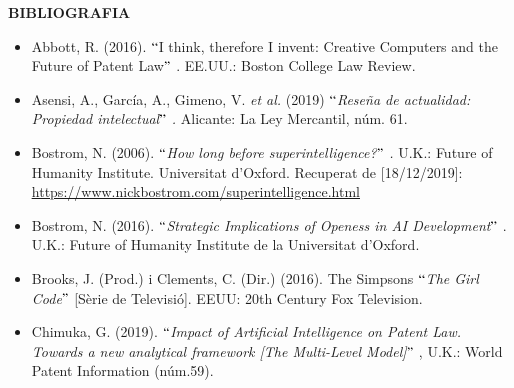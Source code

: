 \documentclass[12pt]{article}
\begin{document}
\vspace{\baselineskip}
\begin{Center}
{\fontsize{16pt}{19.2pt}\selectfont \textbf{BIBLIOGRAFIA}\par}
\end{Center}\par


\vspace{\baselineskip}

\vspace{\baselineskip}
\begin{itemize}
	\item Abbott, R. (2016). $``$I think, therefore I invent: Creative Computers and the Future of Patent Law$"$ . EE.UU.: Boston College Law Review.\par


\vspace{\baselineskip}
	\item Asensi, A., García, A., Gimeno, V. \textit{et al.} (2019)\textit{ $``$Reseña de actualidad: Propiedad intelectual$"$ .} Alicante: La Ley Mercantil, núm. 61.\par


\vspace{\baselineskip}
	\item Bostrom, N. (2006). \textit{$``$How long before superintelligence?$"$ .} U.K.: Future of Humanity Institute. Universitat d’Oxford. Recuperat de [18/12/2019]: \href{https://www.nickbostrom.com/superintelligence.html}{\textcolor[HTML]{0000FF}{\ul{https://www.nickbostrom.com/superintelligence.html}}}\par


\vspace{\baselineskip}
	\item Bostrom, N. (2016). \textit{$``$Strategic Implications of Openess in AI Development$"$ }. U.K.: Future of Humanity Institute de la Universitat d’Oxford.\par


\vspace{\baselineskip}
	\item Brooks, J. (Prod.) i Clements, C. (Dir.) (2016). The Simpsons $``$\textit{The Girl Code}$"$  [Sèrie de Televisió]. EEUU: 20th Century Fox Television.\par


\vspace{\baselineskip}
	\item Chimuka, G. (2019). \textit{$``$Impact of Artificial Intelligence on Patent Law. Towards a new analytical framework [The Multi-Level Model]$"$ }, U.K.: World Patent Information (núm.59). \par



\end{itemize}
\end{document}
